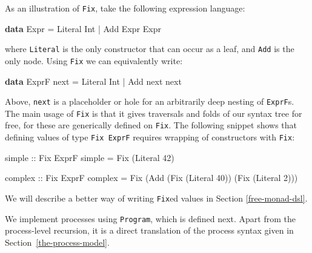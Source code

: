 \documentclass[runningheads,plain]{llncs}
\newenvironment{Shaded}{}{}
\newcommand{\KeywordTok}[1]{\textcolor[rgb]{0.00,0.44,0.13}{\textbf{#1}}}
\newcommand{\DataTypeTok}[1]{\textcolor[rgb]{0.56,0.13,0.00}{#1}}
\newcommand{\DecValTok}[1]{\textcolor[rgb]{0.25,0.63,0.44}{#1}}
\newcommand{\OtherTok}[1]{\textcolor[rgb]{0.00,0.44,0.13}{#1}}
\newcommand{\FunctionTok}[1]{\textcolor[rgb]{0.02,0.16,0.49}{#1}}
\newcommand{\NormalTok}[1]{#1}
\begin{document}
\begin{example}
As an  illustration of \texttt{Fix}, take the following
expression language:
\begin{Shaded}
\begin{Highlighting}[]
\KeywordTok{data} \DataTypeTok{Expr}
    \FunctionTok{=} \DataTypeTok{Literal} \DataTypeTok{Int}
    \FunctionTok{|} \DataTypeTok{Add} \DataTypeTok{Expr} \DataTypeTok{Expr} 
\end{Highlighting}
\end{Shaded}
\noindent
where 
\texttt{Literal} is the only constructor that can occur as a leaf, and
\texttt{Add} is the only node. Using \texttt{Fix} we can equivalently
write:
\begin{Shaded}
\begin{Highlighting}[]
\KeywordTok{data} \DataTypeTok{ExprF}\NormalTok{ next}
    \FunctionTok{=} \DataTypeTok{Literal} \DataTypeTok{Int}
    \FunctionTok{|} \DataTypeTok{Add}\NormalTok{ next next }
\end{Highlighting}
\end{Shaded}
\noindent Above, \texttt{next} is a placeholder or hole for an
arbitrarily deep nesting of \texttt{ExprF}s. The main usage of
\texttt{Fix} is that it gives traversals and folds of our syntax tree
for free, for these are generically defined on \texttt{Fix}.
The following snippet shows that defining values of type \texttt{Fix\ ExprF}
requires wrapping of constructors with \texttt{Fix}:
\begin{Shaded}
\begin{Highlighting}[]
\OtherTok{simple ::} \DataTypeTok{Fix} \DataTypeTok{ExprF}
\NormalTok{simple }\FunctionTok{=} \DataTypeTok{Fix}\NormalTok{ (}\DataTypeTok{Literal} \DecValTok{42}\NormalTok{)}

\OtherTok{complex ::} \DataTypeTok{Fix} \DataTypeTok{ExprF}
\NormalTok{complex }\FunctionTok{=} 
    \DataTypeTok{Fix}\NormalTok{ (}\DataTypeTok{Add}\NormalTok{ (}\DataTypeTok{Fix}\NormalTok{ (}\DataTypeTok{Literal} \DecValTok{40}\NormalTok{)) (}\DataTypeTok{Fix}\NormalTok{ (}\DataTypeTok{Literal} \DecValTok{2}\NormalTok{)))}
\end{Highlighting}
\end{Shaded}
We will describe a better way of writing \texttt{Fix}ed values in Section
\ref{free-monad-dsl}.
\end{example}

We implement processes using \texttt{Program}, which is defined next.
Apart from the process-level recursion, it is a direct translation of the process syntax given in Section~\ref{the-process-model}.
\end{document}
